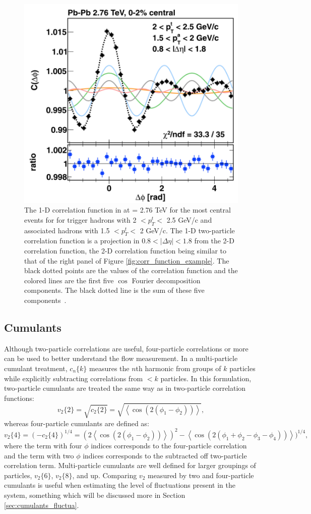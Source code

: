 \begin{figure}[!ht]
\begin{center}
\includegraphics[width=0.48\linewidth]{figs/1d_correlation_function_with_fourier.png}
\caption{The 1-D correlation function in \pbpb at \sqsn = 2.76 TeV for the most central events for for trigger hadrons with 2 $<p_T^t<$ 2.5 GeV/c and associated hadrons with 1.5 $<p_T^t<$ 2 GeV/c. The 1-D two-particle correlation function is a projection in $0.8 < |\Delta\eta| < 1.8$ from the 2-D correlation function, the 2-D correlation function being similar to that of the right panel of Figure \ref{fig:corr_function_example}. The black dotted points are the values of the correlation function and the colored lines are the first five $\cos$ Fourier decomposition  components. The black dotted line is the sum of these five components~\cite{Aamodt2012249}.}
\label{fig:1d_corr_function_example_fourier}
\end{center}
\end{figure}

\subsection{Cumulants}
Although two-particle correlations are useful, four-particle correlations or more can be used to better understand the flow measurement. In a multi-particle cumulant treatment, $c_n\{k\}$ measures the $n$th harmonic from groups of $k$ particles while explicitly subtracting correlations from $< k$ particles. In this formulation, two-particle cumulants are treated the same way as in two-particle correlation functions:
\begin{equation}
v_2\{2\} = \sqrt{c_2\{2\}} = \sqrt{\left<\cos(2(\phi_1-\phi_2))\right>},
\label{eqn:v22}
\end{equation}
whereas four-particle cumulants are defined as:
\begin{equation}
v_2\{4\} = (-c_2\{4\})^{1/4} =  (2\left<\cos(2(\phi_1-\phi_2))\right>)^2 - \left<\cos(2(\phi_1 + \phi_2 - \phi_3 - \phi_4))\right>)^{1/4},
\label{eqn:v24}
\end{equation}
where the term with four $\phi$ indices corresponds to the four-particle correlation and the term with two $\phi$ indices corresponds to the subtracted off two-particle correlation term. Multi-particle cumulants are well defined for larger groupings of particles, $v_2\{6\}$, $v_2\{8\}$, and up. Comparing $v_2$ measured by two and four-particle cumulants is useful when estimating the level of fluctuations present in the system, something which will be discussed more in Section \ref{sec:cumulants_fluctua}.
